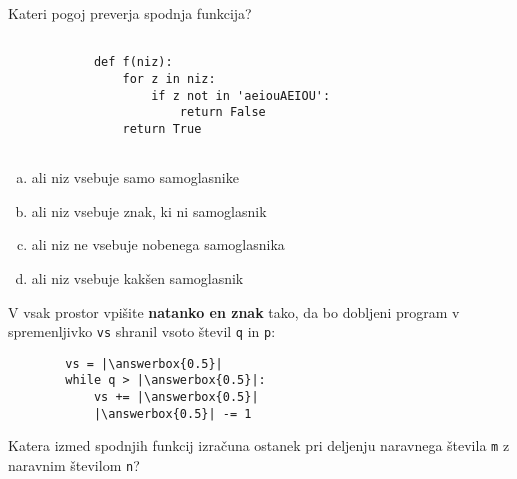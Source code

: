 \documentclass[arhiv, 10pt]{../izpit}
\newcommand{\inlinepy}[1]{\texttt{#1}}
\newcommand{\answerbox}[1]{\framebox{\vphantom{\large M}\hspace{#1cm}}}
\begin{document}
        \naloga*

        \begin{multicols}{2}
        \noindent
        Kateri pogoj preverja spodnja funkcija?
        \begin{verbatim}
        
            def f(niz):
                for z in niz:
                    if z not in 'aeiouAEIOU':
                        return False
                return True
            
        \end{verbatim}

        \begin{enumerate}[(a)]
\item ali niz vsebuje samo samoglasnike
\item ali niz vsebuje znak, ki ni samoglasnik
\item ali niz ne vsebuje nobenega samoglasnika
\item ali niz vsebuje kakšen samoglasnik
\end{enumerate}

        \end{multicols}
    
        \naloga*
        \begin{multicols}{2}
        \noindent
        V vsak prostor vpišite \textbf{natanko en znak} tako, da bo dobljeni program v spremenljivko \inlinepy{vs} shranil vsoto števil \inlinepy{q} in \inlinepy{p}:
        
        \columnbreak
        \begin{verbatim}
        vs = |\answerbox{0.5}|
        while q > |\answerbox{0.5}|:
            vs += |\answerbox{0.5}|
            |\answerbox{0.5}| -= 1
        \end{verbatim}
        \end{multicols}
    
        \clearpage
        \naloga
        
        Katera izmed spodnjih funkcij izračuna ostanek pri deljenju naravnega števila \inlinepy{m} z naravnim številom \inlinepy{n}?
    
\end{document}
